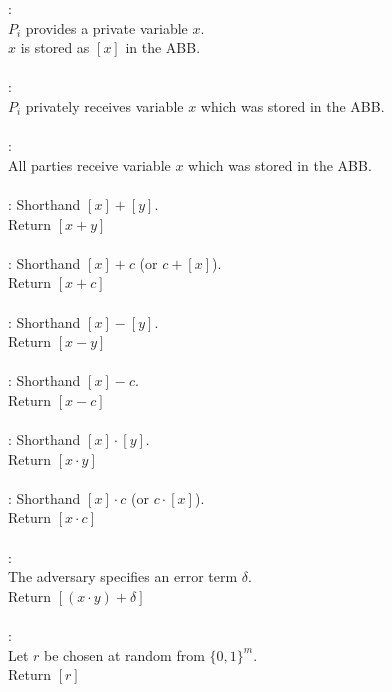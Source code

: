 \begin{functionality}\label{functy:ABB}
	: \\
		\indent $P_i$ provides a private variable $x$. \\
		\indent $x$ is stored as $[x]$ in the ABB. \\ \\ 
	: \\
		\indent $P_i$ privately receives variable $x$ which was stored in the ABB. \\ \\
	\OutputToAll{[x]}: \\ 
		\indent All parties receive variable $x$ which was stored in the ABB. \\ \\
	\Add{[x]}{[y]}: Shorthand $[x] + [y]$. \\
		\indent Return $[x+y]$ \\ \\
	: Shorthand $[x] + c$ (or $c + [x]$). \\
		\indent Return $[x+c]$ \\ \\
	\Sub{[x]}{[y]}: Shorthand $[x] - [y]$. \\
		\indent Return $[x - y]$ \\ \\
	: Shorthand $[x] - c$. \\
		\indent Return $[x - c]$ \\ \\
	\Mult{[x]}{[y]}: Shorthand $[x] \cdot [y]$. \\
		\indent Return $[x \cdot y]$ \\ \\
	: Shorthand $[x] \cdot c$ (or $c \cdot [x]$). \\
		\indent Return $[x \cdot c]$ \\ \\
	\MultWithError{[x]}{[y]}: \\
		\indent The adversary specifies an error term $\delta$.\\
		\indent Return $[ (x \cdot y) + \delta]$ \\ \\
	: \\
		\indent Let $r$ be chosen at random from $\{0, 1\}^m$.\\
		\indent Return $[r]$\\ \\

\end{functionality}
